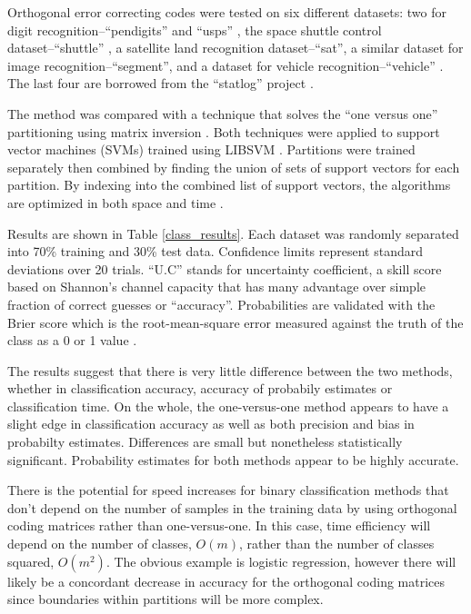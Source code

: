 Orthogonal error correcting codes were tested on six different datasets:
two for digit recognition--``pendigits'' \citep{Alimoglu1996} and
``usps'' \citep{Hull1994}, the space shuttle control dataset--``shuttle''
\citep{King_etal1995}, a satellite land recognition
dataset--``sat'', a similar dataset for image recognition--``segment'',
and a dataset for vehicle recognition--``vehicle'' \citep{Siebert1987}.
The last four are borrowed from the ``statlog'' project \citep{King_etal1995,Michie_etal1994}.

The method was compared with a technique that solves the ``one versus one'' 
partitioning using matrix inversion \citep{Wu_etal2004}.
Both techniques were applied to support vector machines (SVMs) trained using
LIBSVM \citep{Chang_Lin2011}.
Partitions were trained separately then combined by finding the union of
sets of support vectors for each partition.
By indexing into the combined list of support vectors, the algorithms are
optimized in both space and time \citep{Chang_Lin2011}.

Results are shown in Table \ref{class_results}.
Each dataset was randomly separated into 70\% training and 30\%
test data.
Confidence limits represent standard deviations over 20 trials.
``U.C'' stands for uncertainty
coefficient, a skill score based on Shannon's channel capacity
\citep{Shannon,Press_etal1992,Mills2011} that has many advantage over simple
fraction of correct guesses or ``accuracy''.
Probabilities are validated with the Brier score 
which is the root-mean-square
error measured against the truth of the class as a 0 or 1 value
\citep{Brier1950,Jolliffe_Stephenson2003}.

The results suggest that there is very little difference between the two
methods, whether in classification accuracy, accuracy of probabily estimates
or classification time.
On the whole, the one-versus-one method appears to have a slight edge in
classification accuracy as well as both precision and bias in probabilty
estimates.
Differences are small but nonetheless statistically significant.
Probability estimates for both methods appear to be highly accurate.

There is the potential for speed increases for binary classification methods
that don't depend on the number of samples in the training data by using
orthogonal coding matrices rather than one-versus-one.
In this case, time efficiency will depend on the number of classes,
$O(m)$, rather than the number of classes squared, $O(m^2)$.
The obvious example is logistic regression, however there will likely be
a concordant decrease in accuracy for the orthogonal coding matrices since
boundaries within partitions will be more complex.

